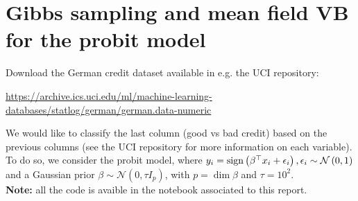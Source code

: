 \documentclass[a4paper, 11pt]{article}
\begin{document}

\maketitle

\section{Gibbs sampling and mean field VB for the probit model}

Download the German credit dataset available in e.g. the UCI repository: 

\begin{center}
\href{https://archive.ics.uci.edu/ml/machine-learning-databases/statlog/german/german.data-numeric}{https://archive.ics.uci.edu/ml/machine-learning-databases/statlog/german/german.data-numeric}
\end{center}

We would like to classify the last column (good vs bad credit) based on the previous columns (see the UCI repository for more information on each variable). To do so, we consider the probit model, where $y_i = \operatorname{sign} \left( \beta^\top x_i + \epsilon_i \right), \epsilon_i \sim \mathcal{N} \left( 0, 1 \right)$ and a Gaussian prior $\beta \sim \mathcal{N} \left( 0, \tau I_p \right)$, with $p = \dim \beta$ and $\tau = 10^2$. \\

\textbf{Note:} all the code is avaible in the notebook associated to this report.
\end{document}
